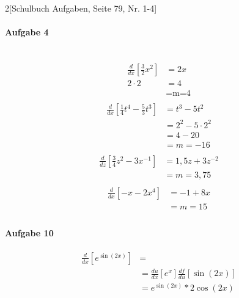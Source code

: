 \documentclass{report}
\begin{document}
\begin{multicols}{2}[Schulbuch Aufgaben, Seite 79, Nr. 1-4]
\paragraph{Aufgabe 4} %
\label{par:aufgabe-vier}
\\
\begin{align*}
\frac{d}{dx}\left[\frac{3}{2}x^2\right]&=2x\\
2\cdot 2 &= 4\\
    &=\text{m=4}\\
\end{align*}
\begin{align*}
 \frac{d}{dx}\left[\frac{1}{4}t^4-\frac{5}{3}t^3\right]&=t^3-5t^2\\
 &=2^2-5\cdot 2^2\\
 &=4-20\\
 &=m=-16\\
\end{align*}
\begin{align*}
  \frac{d}{dz}\left[\frac{3}{4}z^2-3x^{-1}\right] &= 1,5z+3z^{-2}\\
  &=m=3,75\\
\end{align*}
\begin{align*}
 \frac{d}{dx}\left[-x-2x^4\right] &=-1+8x\\
 &=m=15\\
\end{align*}
\paragraph{Aufgabe 10} 
\label{par:Aufgabe 10}
\begin{align*}
\frac{d}{dx}\left[e^{\sin(2x)}\right]&=\\
&=\frac{du}{dx}\left[e^x\right]\frac{df}{du}\left[\sin(2x)\right]\\
&=e^{\sin(2x)}*2\cos(2x)\\
\end{align*}

\end{multicols}
\end{document}
